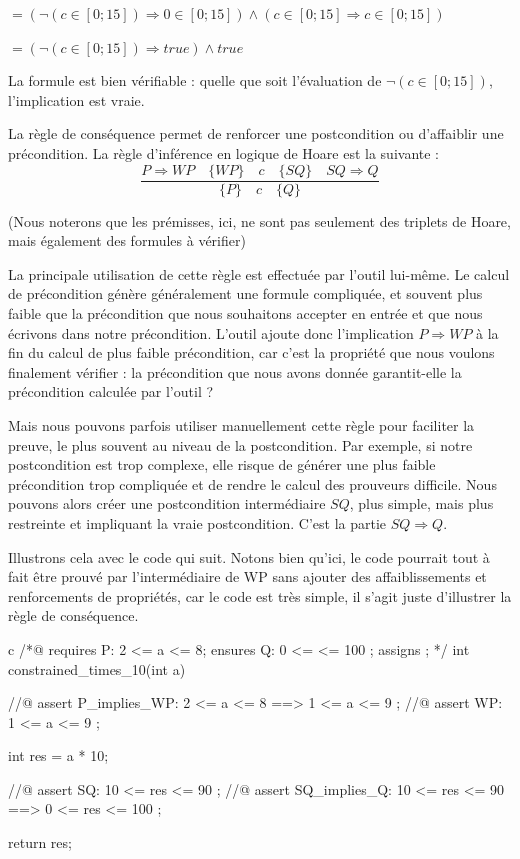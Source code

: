 $= (\neg (c \in [0;15]) \Rightarrow 0 \in [0;15]) \wedge (c \in [0;15] \Rightarrow c \in [0;15])$

$= (\neg (c \in [0;15]) \Rightarrow true) \wedge true$



La formule est bien vérifiable : quelle que soit l'évaluation de $\neg (c \in [0;15])$, l'implication est vraie.


\label{l3:statements-basic-consequence}


La règle de conséquence permet de renforcer une postcondition ou d'affaiblir une
précondition. La règle d'inférence en logique de Hoare est la suivante :
$$\dfrac{P \Rightarrow WP \quad \{WP\}\quad c\quad \{SQ\} \quad SQ \Rightarrow Q}{\{P\}\quad c \quad \{Q\}}$$


(Nous noterons que les prémisses, ici, ne sont pas seulement des triplets de
Hoare, mais également des formules à vérifier)


La principale utilisation de cette règle est effectuée par l'outil lui-même.
Le calcul de précondition génère généralement une formule compliquée, et souvent
plus faible que la précondition que nous souhaitons accepter en entrée et que
nous écrivons dans notre précondition. L'outil ajoute donc l'implication
$P \Rightarrow WP$ à la fin du calcul de plus faible précondition, car c'est la
propriété que nous voulons finalement vérifier : la précondition que nous avons
donnée garantit-elle la précondition calculée par l'outil ?


Mais nous pouvons parfois utiliser manuellement cette règle pour faciliter la
preuve, le plus souvent au niveau de la postcondition. Par exemple, si notre
postcondition est trop complexe, elle risque de générer une plus faible
précondition trop compliquée et de rendre le calcul des prouveurs difficile.
Nous pouvons alors créer une postcondition intermédiaire $SQ$, plus simple, mais
plus restreinte et impliquant la vraie postcondition. C'est la partie
$SQ \Rightarrow Q$.


Illustrons cela avec le code qui suit. Notons bien qu'ici, le code pourrait tout
à fait être prouvé par l'intermédiaire de WP sans ajouter des affaiblissements
et renforcements de propriétés, car le code est très simple, il s'agit juste
d'illustrer la règle de conséquence.


\begin{CodeBlock}{c}
/*@
  requires P: 2 <= a <= 8;
  ensures  Q: 0 <= \result <= 100 ;
  assigns  \nothing ;
*/
int constrained_times_10(int a){
  //@ assert P_implies_WP: 2 <= a <= 8 ==> 1 <= a <= 9 ;
  //@ assert WP:           1 <= a <= 9 ;

  int res = a * 10;

  //@ assert SQ:           10 <= res <= 90 ;
  //@ assert SQ_implies_Q: 10 <= res <= 90 ==> 0 <= res <= 100 ;

  return res;
}
\end{CodeBlock}



